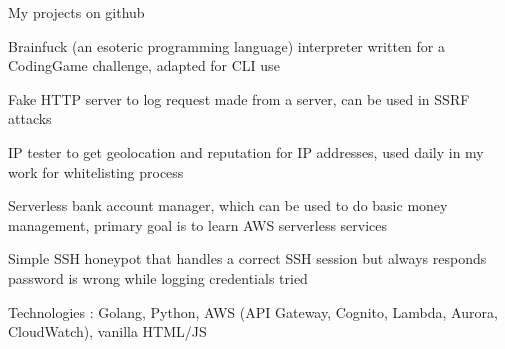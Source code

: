 \begin{cventries}
  \cventry
  {}
  {My projects on github}
  {}
  {}
  {
    \begin{cvitems}
      \item {Brainfuck (an esoteric programming language) interpreter written for a CodingGame challenge, adapted for CLI use}
      \item {Fake HTTP server to log request made from a server, can be used in SSRF attacks}
      \item {IP tester to get geolocation and reputation for IP addresses, used daily in my work for whitelisting process}
      \item {Serverless bank account manager, which can be used to do basic money management, primary goal is to learn AWS serverless services}
      \item {Simple SSH honeypot that handles a correct SSH session but always responds password is wrong while logging credentials tried}
      \item {Technologies : Golang, Python, AWS (API Gateway, Cognito, Lambda, Aurora, CloudWatch), vanilla HTML/JS}
    \end{cvitems}
  }
\end{cventries}